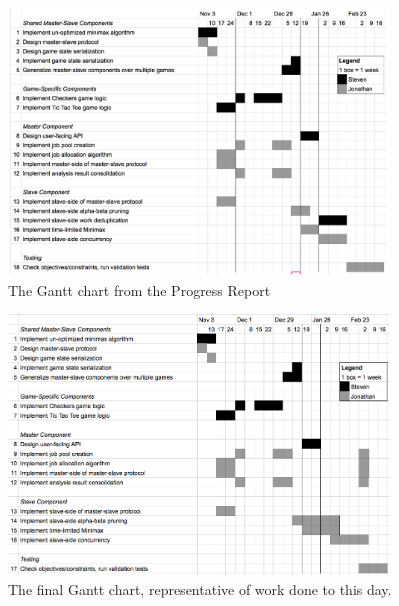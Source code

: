 \documentclass[pdftex,12pt,a4paper]{article}
\begin{document}
\begin{figure}[H]
\begin{center}
\includegraphics[width=0.9\textwidth]{img/gantt-progress}
\caption{The Gantt chart from the Progress Report}
\end{center}
\end{figure}

\begin{figure}[H]
\begin{center}
\includegraphics[width=0.9\textwidth]{img/gantt-final}
\caption{The final Gantt chart, representative of work done to this day.}
\end{center}
\end{figure}

%
%
\pagebreak



\end{document}
